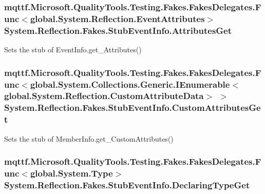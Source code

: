 \hypertarget{class_system_1_1_reflection_1_1_fakes_1_1_stub_event_info_a34ba5be0f8bead05c00ff04863e0c199}{
\subsubsection[{Attributes\-Get}]{\setlength{\rightskip}{0pt plus 5cm}mqttf.\-Microsoft.\-Quality\-Tools.\-Testing.\-Fakes.\-Fakes\-Delegates.\-Func$<$global.\-System.\-Reflection.\-Event\-Attributes$>$ System.\-Reflection.\-Fakes.\-Stub\-Event\-Info.\-Attributes\-Get}}\label{class_system_1_1_reflection_1_1_fakes_1_1_stub_event_info_a34ba5be0f8bead05c00ff04863e0c199}


Sets the stub of Event\-Info.\-get\-\_\-\-Attributes()

\hypertarget{class_system_1_1_reflection_1_1_fakes_1_1_stub_event_info_a81fa0de8aa5c6aebeb5fd17b64393b23}{
\subsubsection[{Custom\-Attributes\-Get}]{\setlength{\rightskip}{0pt plus 5cm}mqttf.\-Microsoft.\-Quality\-Tools.\-Testing.\-Fakes.\-Fakes\-Delegates.\-Func$<$global.\-System.\-Collections.\-Generic.\-I\-Enumerable$<$global.\-System.\-Reflection.\-Custom\-Attribute\-Data$>$ $>$ System.\-Reflection.\-Fakes.\-Stub\-Event\-Info.\-Custom\-Attributes\-Get}}\label{class_system_1_1_reflection_1_1_fakes_1_1_stub_event_info_a81fa0de8aa5c6aebeb5fd17b64393b23}


Sets the stub of Member\-Info.\-get\-\_\-\-Custom\-Attributes()

\hypertarget{class_system_1_1_reflection_1_1_fakes_1_1_stub_event_info_aabbfa908f26e4e3535e5e6f4ad34a8c5}{
\subsubsection[{Declaring\-Type\-Get}]{\setlength{\rightskip}{0pt plus 5cm}mqttf.\-Microsoft.\-Quality\-Tools.\-Testing.\-Fakes.\-Fakes\-Delegates.\-Func$<$global.\-System.\-Type$>$ System.\-Reflection.\-Fakes.\-Stub\-Event\-Info.\-Declaring\-Type\-Get}}\label{class_system_1_1_reflection_1_1_fakes_1_1_stub_event_info_aabbfa908f26e4e3535e5e6f4ad34a8c5}


